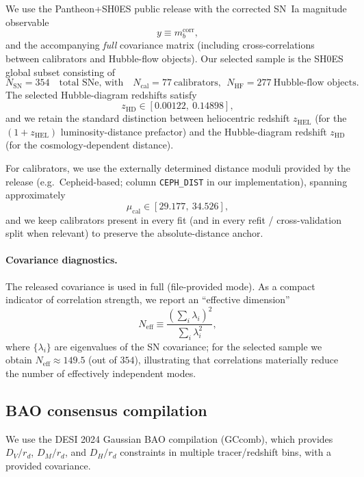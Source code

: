 \documentclass[10pt]{article}
\newcommand{\zhel}{z_{\mathrm{HEL}}}
\newcommand{\zhd}{z_{\mathrm{HD}}}
\begin{document}
We use the Pantheon+SH0ES public release with the corrected SN~Ia magnitude observable
\begin{equation}
y \equiv m_b^{\mathrm{corr}},
\end{equation}
and the accompanying \emph{full} covariance matrix (including cross-correlations between calibrators and Hubble-flow objects).
Our selected sample is the SH0ES global subset consisting of
\begin{equation}
N_{\mathrm{SN}}=354 \quad\text{total SNe, with}\quad
N_{\mathrm{cal}}=77 \ \text{calibrators},\ \ N_{\mathrm{HF}}=277 \ \text{Hubble-flow objects}.
\end{equation}
The selected Hubble-diagram redshifts satisfy
\begin{equation}
\zhd \in [0.00122,\ 0.14898],
\end{equation}
and we retain the standard distinction between heliocentric redshift $\zhel$ (for the $(1+\zhel)$ luminosity-distance prefactor) and the Hubble-diagram redshift $\zhd$ (for the cosmology-dependent distance).

For calibrators, we use the externally determined distance moduli provided by the release (e.g.\ Cepheid-based; column \texttt{CEPH\_DIST} in our implementation), spanning approximately
\begin{equation}
\mu_{\mathrm{cal}} \in [29.177,\ 34.526],
\end{equation}
and we keep calibrators present in every fit (and in every refit / cross-validation split when relevant) to preserve the absolute-distance anchor.

\paragraph{Covariance diagnostics.}
The released covariance is used in full (file-provided mode). As a compact indicator of correlation strength, we report an ``effective dimension''
\begin{equation}
N_{\mathrm{eff}} \equiv \frac{\left(\sum_i \lambda_i\right)^2}{\sum_i \lambda_i^2},
\end{equation}
where $\{\lambda_i\}$ are eigenvalues of the SN covariance; for the selected sample we obtain $N_{\mathrm{eff}}\approx 149.5$ (out of $354$), illustrating that correlations materially reduce the number of effectively independent modes.

\subsection{BAO consensus compilation}
\label{sec:data_bao}
We use the DESI 2024 Gaussian BAO compilation (GCcomb)\cite{DESI2024BAO}, which provides $D_V/r_d$, $D_M/r_d$, and $D_H/r_d$ constraints in multiple tracer/redshift bins, with a provided covariance.
\end{document}
